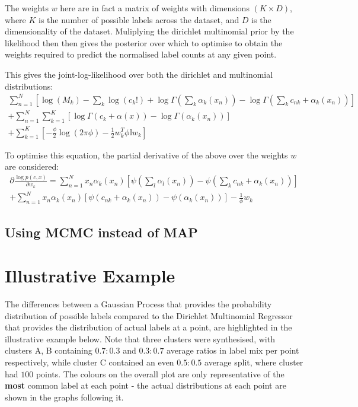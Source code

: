 The weights $w$ here are in fact a matrix of weights with dimensions $(K \times D)$, where $K$ is the number of possible labels across the dataset, and $D$ is the dimensionality of the dataset. Muliplying the dirichlet multinomial prior by the likelihood then then gives the posterior over which to optimise to obtain the weights required to predict the normalised label counts at any given point.

This gives the joint-log-likelihood over both the dirichlet and multinomial distributions:
\begin{multline}
    \sum^N_{n=1} [\log(M_k) - \sum_k \log(c_k!) + \log \Gamma(\sum_k \alpha_k(x_n)) - \log \Gamma(\sum_k c_{nk} + \alpha_k(x_n))] \\
    + \sum^N_{n=1} \sum^K_{k=1} [\log \Gamma(c_k + \alpha(x)) - \log \Gamma(\alpha_k(x_n))] \\
    + \sum^K_{k=1} [-\frac{\phi}{2} \log(2\pi \phi) - \frac{1}{2}w_k^T \phi \mathbb{I} w_k]
\end{multline}

To optimise this equation, the partial derivative of the above over the weights $w$ are considered:
\begin{multline}
    \partial \frac{\log p(c, x)}{\partial w_k} = \sum_{n=1}^N x_n \alpha_k (x_n) [\psi(\sum_l \alpha_l(x_n)) - \psi(\sum_k c_{nk} + \alpha_k(x_n))] \\
    + \sum^N_{n=1} x_n \alpha_k (x_n) [\psi (c_{nk} + \alpha_k(x_n)) - \psi(\alpha_k(x_n))] - \frac{1}{\phi} w_k
\end{multline}


\subsection{Using MCMC instead of MAP}

\section{Illustrative Example}

The differences between a Gaussian Process that provides the probability distribution of possible labels compared to the Dirichlet Multinomial Regressor that provides the distribution of actual labels at a point, are highlighted in the illustrative example below. Note that three clusters were synthesised, with clusters A, B containing $0.7:0.3$ and $0.3:0.7$ average ratios in label mix per point respectively, while cluster C contained an even $0.5:0.5$ average split, where cluster had $100$ points. The colours on the overall plot are only representative of the \textbf{most} common label at each point - the actual distributions at each point are shown in the graphs following it.

